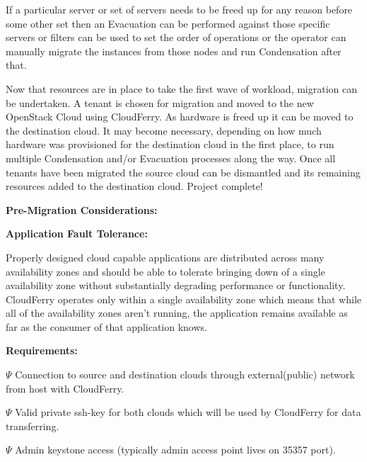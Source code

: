 \documentclass{article}
\begin{document}
\vspace{2pt}
{\color{color03} If a particular server or set of servers needs to be freed up 
for any reason before some other set then an Evacuation can be performed against 
those specific servers or filters can be used to set the order of operations or 
the operator can manually migrate the instances from those nodes and run Condensation 
after that. }

\vspace{2pt}
{\color{color03} Now that resources are in place to take the first wave of workload, 
migration can be undertaken. A tenant is chosen for migration and moved to the 
new OpenStack Cloud using CloudFerry. As hardware is freed up it can be moved to 
the destination cloud. It may become necessary, depending on how much hardware 
was provisioned for the destination cloud in the first place, to run multiple Condensation 
and/or Evacuation processes along the way. Once all tenants have been migrated 
the source cloud can be dismantled and its remaining resources added to the destination 
cloud. Project complete!}

\vspace{22pt}
{\large{}{\color{color03} \textbf{Pre-Migration Considerations:}}}

\vspace{2pt}
{\large{}{\color{color03} \textbf{Application Fault Tolerance:}}}

\vspace{2pt}
{\color{color03} Properly designed cloud capable applications are distributed across 
many availability zones and should be able to tolerate bringing down of a single 
availability zone without substantially degrading performance or functionality. 
CloudFerry operates only within a single availability zone which means that while 
all of the availability zones aren't running, the application remains available 
as far as the consumer of that application knows. }

\vspace{2pt}
{\large{}{\color{color03} \textbf{Requirements:}}}

$\Psi$ {\color{color03} Connection to source and destination clouds through external(public) 
network from host with CloudFerry.}

$\Psi$ {\color{color03} Valid private ssh-key for both clouds which will be used 
by CloudFerry for data transferring.}

$\Psi$ {\color{color03} Admin keystone access (typically admin access point lives 
on 35357 port).}
\end{document}
